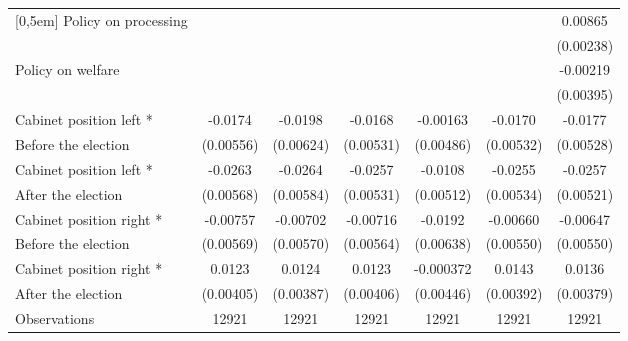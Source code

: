 \begin{table}[!ht]
\begin{tabular}{l*{6}{c}}
[0,5em]
Policy on processing&                     &                     &                     &                     &                     &     0.00865\sym{***}\\
                    &                     &                     &                     &                     &                     &   (0.00238)         \\
[0,5em]
Policy on welfare   &                     &                     &                     &                     &                     &    -0.00219         \\
                    &                     &                     &                     &                     &                     &   (0.00395)         \\
[0,5em]
Cabinet position left * &     -0.0174\sym{**} &     -0.0198\sym{**} &     -0.0168\sym{**} &    -0.00163         &     -0.0170\sym{**} &     -0.0177\sym{**} \\
Before the election                    &   (0.00556)         &   (0.00624)         &   (0.00531)         &   (0.00486)         &   (0.00532)         &   (0.00528)         \\
[0,5em]
Cabinet position left * &     -0.0263\sym{***}&     -0.0264\sym{***}&     -0.0257\sym{***}&     -0.0108\sym{*}  &     -0.0255\sym{***}&     -0.0257\sym{***}\\
After the election                    &   (0.00568)         &   (0.00584)         &   (0.00531)         &   (0.00512)         &   (0.00534)         &   (0.00521)         \\
[0,5em]
Cabinet position right * &    -0.00757         &    -0.00702         &    -0.00716         &     -0.0192\sym{**} &    -0.00660         &    -0.00647         \\
Before the election                    &   (0.00569)         &   (0.00570)         &   (0.00564)         &   (0.00638)         &   (0.00550)         &   (0.00550)         \\
[0,5em]
Cabinet position right *&      0.0123\sym{**} &      0.0124\sym{**} &      0.0123\sym{**} &   -0.000372         &      0.0143\sym{***}&      0.0136\sym{***}\\
 After the election                    &   (0.00405)         &   (0.00387)         &   (0.00406)         &   (0.00446)         &   (0.00392)         &   (0.00379)         \\
\hline
Observations        &       12921         &       12921         &       12921         &       12921         &       12921         &       12921         \\

\end{tabular}
\end{table}
